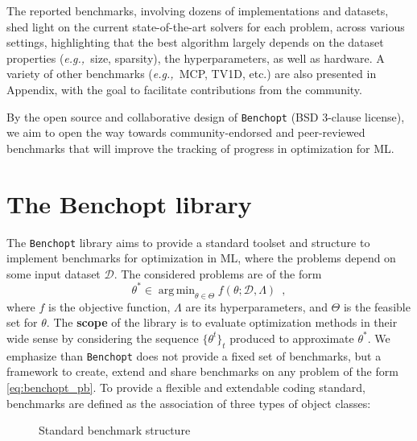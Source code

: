 \documentclass{article}
\newcommand{\eg}{{\em e.g.,~}}
\newcommand{\rebuttal}[1]{#1}
\newcommand{\Benchopt}{{{\texttt{Benchopt}}}}
\newcommand{\argmin}{\mathop{\mathrm{arg\,min}}}
\begin{document}
The reported benchmarks, involving dozens of implementations and datasets, shed light on the current state-of-the-art solvers for each problem, across various settings, highlighting that the best algorithm largely depends on the dataset properties (\eg size, sparsity), the hyperparameters, as well as hardware.
A variety of other benchmarks (\eg MCP, TV1D, etc.) are also presented in Appendix, with the goal to facilitate contributions from the community.

By the open source and collaborative design of \Benchopt{} (BSD 3-clause license), we aim to open the way towards community-endorsed and peer-reviewed benchmarks that will improve the tracking of progress in optimization for ML.
\section{The Benchopt library}
The \Benchopt{} library aims to provide a \rebuttal{standard toolset and structure to implement}  benchmarks for optimization in ML, where the problems depend on some input dataset $\mathcal D$.
The considered problems are of the form
\begin{equation}\label{eq:benchopt_pb}
    \theta^* \in \argmin_{\theta\in\Theta} f(\theta; \mathcal D, \Lambda)\enspace,
\end{equation}
where $f$ is the objective function, $\Lambda$ are its hyperparameters,
and $\Theta$ is the feasible set for $\theta$.
The \textbf{scope} of the library is to evaluate optimization methods in their wide sense by considering the sequence $\{\theta^t\}_t$ produced to approximate $\theta^*$.
\rebuttal{We emphasize than \Benchopt{} does not provide a fixed set of benchmarks, but a framework to create, extend and share benchmarks on any problem of the form \eqref{eq:benchopt_pb}.}
To provide a flexible and extendable \rebuttal{coding standard}, benchmarks are defined as the association of three types of object classes:
\;\;\;\;\;\;\;\;\;\;\;\;\;\;\;\;\;\;\;\;\;\;\;\;\;\;
\;\;\;\;\;\;\;\;\;\;\;\;\;\;\;\;\;\;\;\;\;\;\;\;\;\;
\;\;\;\;\;\;\;\;\;\;\;\;\;\;\;\;\;\;\;\;\;\;\;\;\;\;
\begin{wrapfigure}{r}{3.1cm}
    \small {}
\caption{Standard benchmark structure}
\end{wrapfigure}
\end{document}
